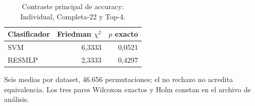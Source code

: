 \begin{table}[!htbp]\centering
\fontsize{9}{11}\selectfont\setlength{\tabcolsep}{4pt}
\caption{Contraste principal de accuracy: Individual, Completa-22 y Top-4.}\label{tab:accuracy-statistics}
\begin{tabular}{@{}lrr@{}}\toprule
Clasificador & Friedman $\chi^2$ & $p$ exacto\\\midrule
SVM & 6,3333 & 0,0521\\
RESMLP & 2,3333 & 0,4297\\
\bottomrule\end{tabular}
\par\smallskip\begin{minipage}{0.98\textwidth}\footnotesize Seis medias por dataset, 46.656 permutaciones; el no rechazo no acredita equivalencia. Los tres pares Wilcoxon exactos y Holm constan en el archivo de análisis.\end{minipage}
\end{table}
